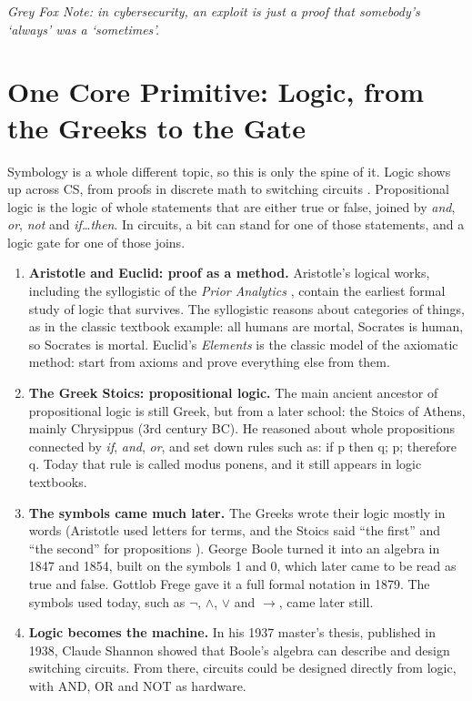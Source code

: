 \documentclass[11pt,a4paper]{article}
\newcommand{\gfnote}[1]{\par{\itshape Grey Fox Note: #1}\par}
\begin{document}
\gfnote{in cybersecurity, an exploit is just a proof that somebody's `always' was a `sometimes'.}

\section{One Core Primitive: Logic, from the Greeks to the Gate}

Symbology is a whole different topic, so this is only the spine of it. Logic shows up across CS,
from proofs in discrete math \cite{rosen} to switching circuits \cite{shannon}. Propositional logic is the logic of
whole statements that are either true or false, joined by \textit{and}, \textit{or}, \textit{not} and \textit{if\ldots then}. \cite{rosen} In circuits,
a bit can stand for one of those statements, and a logic gate for one of those joins. \cite{shannon}

\begin{enumerate}
  \item \textbf{Aristotle and Euclid: proof as a method.} Aristotle's logical works, including the
        syllogistic of the \textit{Prior Analytics} \cite{aristotle}, contain the earliest formal study of logic that
        survives. \cite{smith} The syllogistic reasons about categories of things, as in the classic textbook
        example: all humans are mortal, Socrates is human, so Socrates is mortal. Euclid's
        \textit{Elements} \cite{euclid} is the classic model of the axiomatic method: start from axioms and prove
        everything else from them.
  \item \textbf{The Greek Stoics: propositional logic.} The main ancient ancestor of propositional logic
        is still Greek, but from a later school: the Stoics of Athens, mainly Chrysippus (3rd
        century BC). \cite{mates} He reasoned about whole propositions connected by \textit{if}, \textit{and}, \textit{or}, and set
        down rules such as: if p then q; p; therefore q. Today that rule is called modus ponens, and
        it still appears in logic textbooks. \cite{rosen} \cite{mates}
  \item \textbf{The symbols came much later.} The Greeks wrote their logic mostly in words (Aristotle
        used letters for terms, and the Stoics said ``the first'' and ``the second'' for propositions \cite{aristotle}
        \cite{mates}). George Boole turned it into an algebra in 1847 and 1854, built on the symbols 1 and
        0, which later came to be read as true and false. \cite{boole} Gottlob Frege gave it a full formal
        notation in 1879. \cite{frege} The symbols used today, such as $\neg$, $\wedge$, $\vee$ and $\rightarrow$, came later still.
  \item \textbf{Logic becomes the machine.} In his 1937 master's thesis, published in 1938, Claude
        Shannon showed that Boole's algebra can describe and design switching circuits. \cite{shannon}
        From there, circuits could be designed directly from logic, with AND, OR and NOT as
        hardware.
\end{enumerate}
\end{document}
